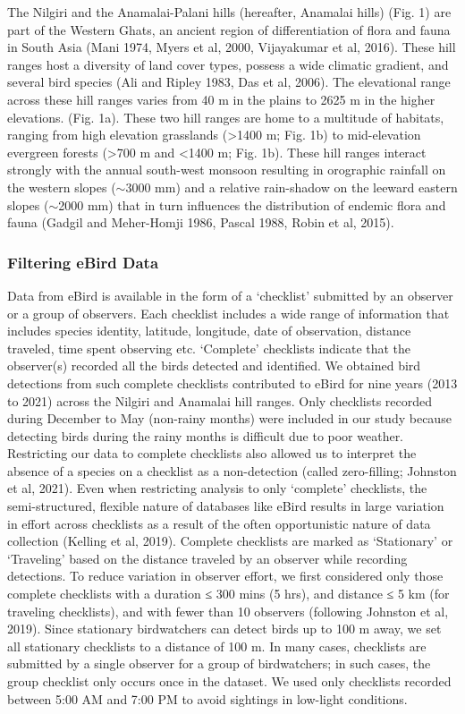 The Nilgiri and the Anamalai-Palani hills (hereafter, Anamalai hills) (Fig.
1) are part of the Western Ghats, an ancient region of differentiation of flora and fauna in South Asia (Mani 1974, Myers et al, 2000, Vijayakumar et al, 2016).
These hill ranges host a diversity of land cover types, possess a wide climatic gradient, and several bird species (Ali and Ripley 1983, Das et al, 2006).
The elevational range across these hill ranges varies from 40 m in the plains to 2625 m in the higher elevations.
(Fig.
1a).
These two hill ranges are home to a multitude of habitats, ranging from high elevation grasslands (>1400 m; Fig.
1b) to mid-elevation evergreen forests (>700 m and <1400 m; Fig.
1b).
These hill ranges interact strongly with the annual south-west monsoon resulting in orographic rainfall on the western slopes ($\sim$3000 mm) and a relative rain-shadow on the leeward eastern slopes ($\sim$2000 mm) that in turn influences the distribution of endemic flora and fauna (Gadgil and Meher-Homji 1986, Pascal 1988, Robin et al, 2015).

\subsubsection*{Filtering eBird Data}

Data from eBird is available in the form of a `checklist' submitted by an observer or a group of observers.
Each checklist includes a wide range of information that includes species identity, latitude, longitude, date of observation, distance traveled, time spent observing etc.
`Complete' checklists indicate that the observer(s) recorded all the birds detected and identified.
We obtained bird detections from such complete checklists contributed to eBird for nine years (2013 to 2021) across the Nilgiri and Anamalai hill ranges.
Only checklists recorded during December to May (non-rainy months) were included in our study because detecting birds during the rainy months is difficult due to poor weather.
Restricting our data to complete checklists also allowed us to interpret the absence of a species on a checklist as a non-detection (called zero-filling; Johnston et al, 2021).
Even when restricting analysis to only `complete' checklists, the semi-structured, flexible nature of databases like eBird results in large variation in effort across checklists as a result of the often opportunistic nature of data collection (Kelling et al, 2019).
Complete checklists are marked as `Stationary' or `Traveling' based on the distance traveled by an observer while recording detections.
To reduce variation in observer effort, we first considered only those complete checklists with a duration ≤ 300 mins (5 hrs), and distance ≤ 5 km (for traveling checklists), and with fewer than 10 observers (following Johnston et al, 2019).
Since stationary birdwatchers can detect birds up to 100 m away, we set all stationary checklists to a distance of 100 m.
In many cases, checklists are submitted by a single observer for a group of birdwatchers; in such cases, the group checklist only occurs once in the dataset.
We used only checklists recorded between 5:00 AM and 7:00 PM to avoid sightings in low-light conditions.

